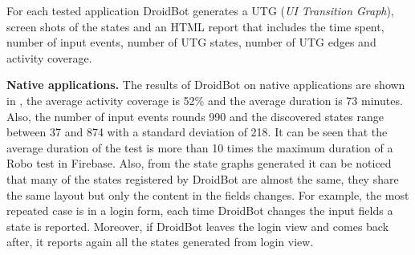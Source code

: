 For each tested application DroidBot generates a UTG (\textit{UI Transition Graph}), screen shots of the states and an HTML report that includes the time spent, number of input events, number of UTG states, number of UTG edges and activity coverage.

\textbf{Native applications.} The results of DroidBot on native applications are shown in , the average activity coverage is 52\% and  the average duration is 73 minutes. Also, the number of input events rounds 990 and the discovered states range between 37 and 874 with a standard deviation of 218. It can be seen that the average duration of the test is more than 10 times the maximum duration of a Robo test in Firebase. Also, from the state graphs generated it can be noticed that many of the states registered by DroidBot are almost the same, they share the same layout but only the content in the fields changes. For example, the most repeated case is in a login form, each time DroidBot changes the input fields a state is reported. Moreover, if DroidBot leaves the login view and comes back after, it reports again all the states generated from login view.


